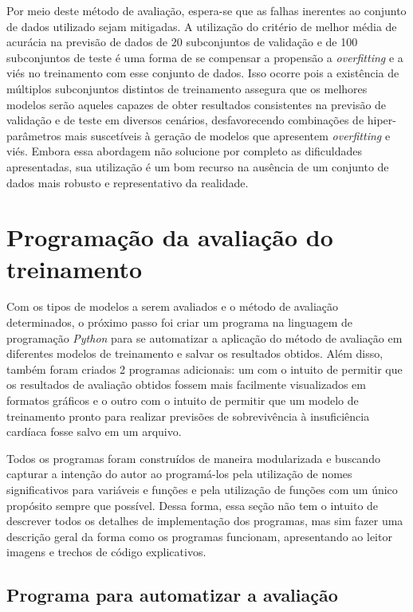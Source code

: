 Por meio deste método de avaliação, espera-se que as falhas inerentes ao conjunto de dados utilizado sejam mitigadas. A utilização do critério de melhor média de acurácia na previsão de dados de 20 subconjuntos de validação e de 100 subconjuntos de teste é uma forma de se compensar a propensão a \textit{overfitting} e a viés no treinamento com esse conjunto de dados. Isso ocorre pois a existência de múltiplos subconjuntos distintos de treinamento assegura que os melhores modelos serão aqueles capazes de obter resultados consistentes na previsão de validação e de teste em diversos cenários, desfavorecendo combinações de hiper-parâmetros mais suscetíveis à geração de modelos que apresentem \textit{overfitting} e viés. Embora essa abordagem não solucione por completo as dificuldades apresentadas, sua utilização é um bom recurso na ausência de um conjunto de dados mais robusto e representativo da realidade.

\section{Programação da avaliação do treinamento}

Com os tipos de modelos a serem avaliados e o método de avaliação determinados, o próximo passo foi criar um programa na linguagem de programação \textit{Python} para se automatizar a aplicação do método de avaliação em diferentes modelos de treinamento e salvar os resultados obtidos. Além disso, também foram criados 2 programas adicionais: um com o intuito de permitir que os resultados de avaliação obtidos fossem mais facilmente visualizados em formatos gráficos e o outro com o intuito de permitir que um modelo de treinamento pronto para realizar previsões de sobrevivência à insuficiência cardíaca fosse salvo em um arquivo.

Todos os programas foram construídos de maneira modularizada e buscando capturar a intenção do autor ao programá-los pela utilização de nomes significativos para variáveis e funções e pela utilização de funções com um único propósito sempre que possível. Dessa forma, essa seção não tem o intuito de descrever todos os detalhes de implementação dos programas, mas sim fazer uma descrição geral da forma como os programas funcionam, apresentando ao leitor imagens e trechos de código explicativos.

\subsection{Programa para automatizar a avaliação}

